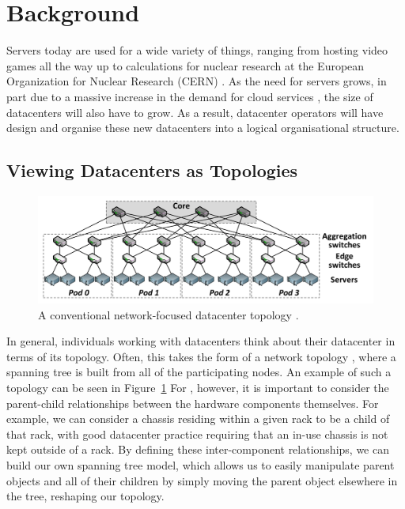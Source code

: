 \documentclass[11pt]{article}
\begin{document}
	

\newpage

\section{Background} \label{sec:background}
	Servers today are used for a wide variety of things, ranging from hosting video games all the way up to calculations for nuclear research at the European Organization for Nuclear Research (CERN) \cite{Andrade2012}.
	As the need for servers grows, in part due to a massive increase in the demand for cloud services \cite{Pring2009}, the size of datacenters will also have to grow.
	As a result, datacenter operators will have design and organise these new datacenters into a logical organisational structure.
	\subsection{Viewing Datacenters as Topologies}
		\begin{figure}[]
			\centering
			\includegraphics[width=\textwidth]{couto2012/Fat-tree-with-4-port-switches-n-4.png}
			\caption[A conventional network-focused datacenter topology]{A conventional network-focused datacenter topology \cite{Couto2012}.}
			\label{fig:networktopology}
		\end{figure}
		In general, individuals working with datacenters think about their datacenter in terms of its topology. 
		Often, this takes the form of a network topology \cite{Couto2012}, where a spanning tree is built from all of the participating nodes.
		An example of such a topology can be seen in Figure~\ref{fig:networktopology} 
		For \opendc{}, however, it is important to consider the parent-child relationships between the hardware components themselves. 
		For example, we can consider a chassis residing within a given rack to be a child of that rack, with good datacenter practice requiring that an in-use chassis is not kept outside of a rack.
		By defining these inter-component relationships, we can build our own spanning tree model, which allows us to easily manipulate parent objects and all of their children by simply moving the parent object elsewhere in the tree, reshaping our topology.
\end{document}
